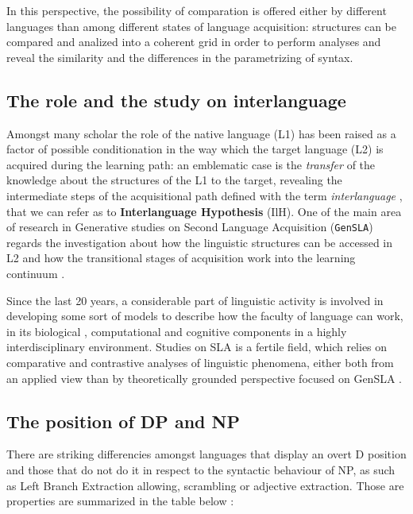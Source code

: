 \documentclass[a4paper,twoside,12pt,chapterprefix=false,listof=flat]{scrartcl}
\theoremstyle{plain} %
\theoremstyle{definition}
\theoremstyle{remark}
\begin{document}
In this perspective, the possibility of comparation is offered either by
different languages than among different states of language acquisition:
structures can be compared and analized into a coherent grid in order to
perform analyses and reveal the similarity and the differences in the
parametrizing of syntax.

\subsection{The role and the study on
interlanguage}\label{the-role-and-the-study-on-interlanguage}

Amongst many scholar the role of the native language (L1) has been
raised as a factor of possible conditionation in the way which the
target language (L2) is acquired during the learning path: an emblematic
case is the \emph{transfer} of the knowledge about the structures of the
L1 to the target, revealing the intermediate steps of the acquisitional
path defined with the term \emph{interlanguage} \citep{selinker1972},
that we can refer as to \textbf{Interlanguage Hypothesis} (IlH). One of
the main area of research in Generative studies on Second Language
Acquisition (\texttt{GenSLA}) regards the investigation about how the
linguistic structures can be accessed in L2 and how the transitional
stages of acquisition work into the learning continuum
\citep{rothmanslabakova2017}.

Since the last 20 years, a considerable part of linguistic activity is
involved in developing some sort of models to describe how the faculty
of language can work, in its biological \citep{hcf2002}, computational
\citep{fodor2001} and cognitive components in a highly interdisciplinary
environment. Studies on SLA is a fertile field, which relies on
comparative and contrastive analyses of linguistic phenomena, either
both from an applied view \citep{ellis1994} than by theoretically
grounded perspective focused on GenSLA
\citep{guasti2002, hawkins2001, rothmanslabakova2017, sorace2011}.

\subsection{The position of DP and NP}\label{the-position-of-dp-and-np}

There are striking differencies amongst languages that display an overt
D position and those that do not do it in respect to the syntactic
behaviour of NP, as such as Left Branch Extraction allowing, scrambling
or adjective extraction. Those are properties are summarized in the
table below \citep[in][ from \citet{boskovic2009}]{salzmann2018}:
\end{document}

